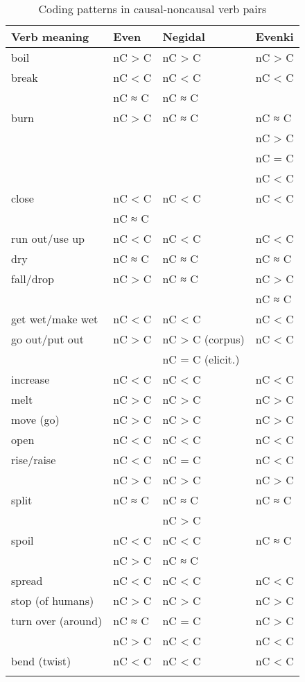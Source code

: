 \documentclass[output=paper,colorlinks,citecolor=brown]{langscibook}
\begin{document}
\begin{table}\small
{}
\begin{tabular}{ l p{2.5cm} p{2.5cm} p{2.5cm} }
  \lsptoprule
Verb meaning &	Even &	Negidal & 	Evenki\\
  \midrule
boil &	nC > C &	nC > C &	nC > C\\
\midrule
break &	nC < C &	nC < C &	nC < C\\
& nC  ≈ C & nC ≈ C &\\
\midrule
burn &	nC > C &	nC ≈ C &	nC ≈ C\\
& & & nC > C\\
& & & nC = C\\
& & & nC < C\\
\midrule
close &	nC < C & nC < C &	nC < C\\
& nC ≈ C	& &\\
\midrule
run out/use up &	nC < C &	nC < C &	nC < C\\
\midrule
dry &	nC ≈ C &	nC ≈ C &	nC ≈ C\\
\midrule
fall/drop &	nC > C &	nC ≈ C &	nC > C\\
& & & nC ≈ C\\
\midrule
get wet/make wet &	nC < C &	nC < C &	nC < C\\
\midrule
go out/put out &	nC > C &	nC > C (corpus) & nC < C\\
& & nC = C (elicit.)	&\\
\midrule
increase &	nC < C &	nC < C &	nC < C\\
\midrule
melt &	nC > C &	nC > C &	nC > C\\
\midrule
move (go) &	nC > C &	nC > C &	nC > C\\
\midrule
open &	nC < C &	nC < C &	nC < C\\
\midrule
rise/raise &	nC < C & nC = C & nC < C\\
& nC > C & nC > C & nC > C\\
\midrule
split &	nC ≈ C &	nC ≈ C & nC ≈ C\\
& & nC > C &\\
\midrule
spoil &	nC < C & nC < C & nC ≈ C\\
& nC > C & nC ≈ C &\\
\midrule
spread &	nC < C &	nC < C &	nC < C\\
\midrule
stop (of humans) &	nC > C &	nC > C &	nC > C\\
\midrule
turn over (around) &	nC ≈ C & nC = C & nC > C\\
& nC > C	& nC < C & nC < C\\
\midrule
bend (twist) &	nC < C &	nC < C &	nC < C\\
  \lspbottomrule
\end{tabular}
\caption{Coding patterns in causal-noncausal verb pairs}
\label{table:2.4}
\end{table}
\end{document}
